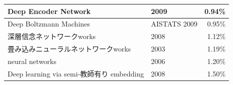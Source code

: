 \begin{table}[htbp]
\begin{center}
\begin{tabular}{|l|l|r|}
    Deep Encoder Network \cite{min2009large-margin}& 2009 & 0.94\% \\ \hline
    Deep Boltzmann Machines \cite{salakhutdinov2009deep}& AISTATS 2009 & 0.95\% \\ \hline
    深層信念ネットワークworks \cite{dahl2008cs81:}& 2008 & 1.12\% \\ \hline
    畳み込みニューラルネットワークworks  \cite{simard2003best}& 2003 & 1.19\% \\ \hline
    neural networks \cite{hinton2006reducing}& 2006 & 1.20\% \\ \hline
    Deep learning via semi-教師有り embedding \cite{weston2012deep}& 2008 & 1.50\% \\ \hline
    \end{tabular}%
  \label{c5_mnist_rank}%
  \end{center}
\end{table}%

